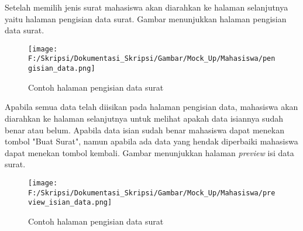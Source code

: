 \begin{enumerate}
	Setelah memilih jenis surat mahasiswa akan diarahkan ke halaman selanjutnya yaitu halaman pengisian data surat. Gambar menunjukkan halaman pengisian data surat.
	\begin{figure}[H]
	\centering
		\texttt{[image: F:/Skripsi/Dokumentasi\_Skripsi/Gambar/Mock\_Up/Mahasiswa/pengisian\_data.png]}
		\caption{Contoh halaman pengisian data surat}
		\label{fig:contoh_halaman_pengisian_data_surat}
	\end{figure}
	
	Apabila semua data telah diisikan pada halaman pengisian data, mahasiswa akan diarahkan ke halaman selanjutnya untuk melihat apakah data isiannya sudah benar atau belum. Apabila data isian sudah benar mahasiswa dapat menekan tombol "Buat Surat", namun apabila ada data yang hendak diperbaiki mahasiswa dapat menekan tombol kembali. Gambar menunjukkan halaman \textit{preview} isi data surat.
	\begin{figure}[H]
	\centering
		\texttt{[image: F:/Skripsi/Dokumentasi\_Skripsi/Gambar/Mock\_Up/Mahasiswa/preview\_isian\_data.png]}
		\caption{Contoh halaman pengisian data surat}
		\label{fig:contoh_halaman_pengisian_data_surat}
	\end{figure}
\end{enumerate}

